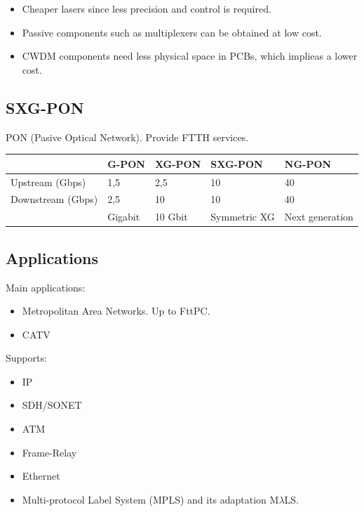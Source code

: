 \documentclass[../main.tex]{subfiles}
\begin{document}
\begin{itemize}
	\item Cheaper lasers since less precision and control is required.
	\item Passive components such as multiplexers can be obtained at low cost.
	\item CWDM components need less physical space in PCBs, which implieas a lower cost.
\end{itemize}

\subsection{SXG-PON}

PON (Pasive Optical Network). Provide FTTH services.

\begin{tabular}{|l|l|l|l|l|}
	\hline
						& G-PON	& XG-PON	& SXG-PON	& NG-PON \\
	\hline
	Upstream (Gbps)		& 1,5	& 2,5		& 10		& 40 \\
	\hline
	Downstream (Gbps)	& 2,5	& 10		& 10		& 40 \\
	\hline
						& Gigabit			& 10 Gbit	& Symmetric XG	& Next generation \\
	\hline
\end{tabular}

\subsection{Applications}

Main applications:

\begin{itemize}
	\item Metropolitan Area Networks. Up to FttPC.
	\item CATV
\end{itemize}

Supports:

\begin{itemize}
	\item IP
	\item SDH/SONET
	\item ATM
	\item Frame-Relay
	\item Ethernet
	\item Multi-protocol Label System (MPLS) and its adaptation M$\lambda$LS.
\end{itemize}
\end{document}
